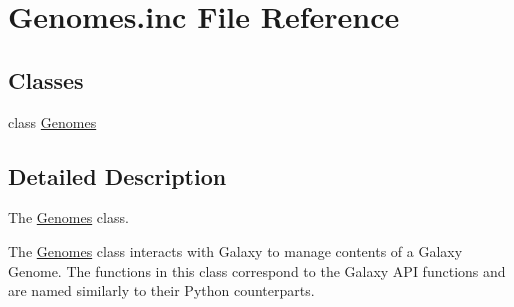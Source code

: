 \hypertarget{Genomes_8inc}{}\section{Genomes.\+inc File Reference}
\label{Genomes_8inc}
\subsection*{Classes}
\begin{DoxyCompactItemize}
\item 
class \hyperlink{classGenomes}{Genomes}
\end{DoxyCompactItemize}


\subsection{Detailed Description}
The \hyperlink{classGenomes}{Genomes} class.

The \hyperlink{classGenomes}{Genomes} class interacts with Galaxy to manage contents of a Galaxy Genome. The functions in this class correspond to the Galaxy A\+PI functions and are named similarly to their Python counterparts. 
